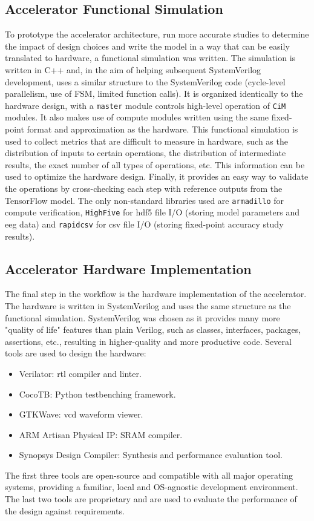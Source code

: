 \subsection{Accelerator Functional Simulation}
To prototype the accelerator architecture, run more accurate studies to determine the impact of design choices and write the model in a way that can be easily translated to 
hardware, a functional simulation was written. The simulation is written in C++ and, in the aim of helping subsequent SystemVerilog development, uses a similar structure to
the SystemVerilog code (cycle-level parallelism, use of FSM, limited function calls). It is organized identically to the hardware design, with a \texttt{master} module controls
high-level operation of \texttt{CiM} modules. It also makes use of compute modules written using the same fixed-point format and approximation as the hardware. This functional 
simulation is used to collect metrics that are difficult to measure in hardware, such as the distribution of inputs to certain operations, the distribution of intermediate results,
the exact number of all types of operations, etc. This information can be used to optimize the hardware design. Finally, it provides an easy way to validate the operations by
cross-checking each step with reference outputs from the TensorFlow model. The only non-standard libraries used are \texttt{armadillo} for compute verification, \texttt{HighFive}
for \ac{hdf5} file I/O (storing model parameters and \ac{eeg} data) and \texttt{rapidcsv} for \ac{csv} file I/O (storing fixed-point accuracy study results).

\subsection{Accelerator Hardware Implementation}
The final step in the workflow is the hardware implementation of the accelerator. The hardware is written in SystemVerilog and uses the same structure as the functional simulation.
SystemVerilog was chosen as it provides many more "quality of life" features than plain Verilog, such as classes, interfaces, packages, assertions, etc., resulting in higher-quality
and more productive code. Several tools are used to design the hardware:
\begin{itemize}
    \item Verilator: \ac{rtl} compiler and linter.
    \item CocoTB: Python testbenching framework.
    \item GTKWave: \ac{vcd} waveform viewer.
    \item ARM Artisan Physical IP: SRAM compiler.
    \item Synopsys Design Compiler: Synthesis and performance evaluation tool.
\end{itemize}
The first three tools are open-source and compatible with all major operating systems, providing a familiar, local and OS-agnostic development environment. The last two tools
are proprietary and are used to evaluate the performance of the design against requirements.
